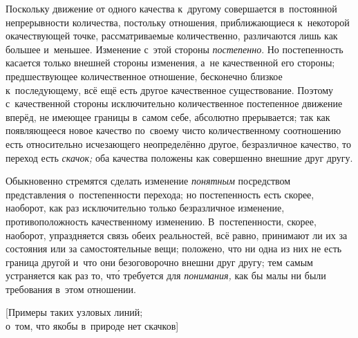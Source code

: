 Поскольку движение от одного качества к~другому совершается в~постоянной
непрерывности количества, постольку отношения, приближающиеся к~некоторой
окачествующей точке, рассматриваемые количественно, различаются лишь как
большее и~меньшее. Изменение с~этой стороны {\em постепенно}. Но постепенность
касается только внешней стороны изменения, а~не качественной его стороны;
предшествующее количественное отношение, бесконечно близкое к~последующему,
всё ещё есть другое качественное существование. Поэтому с~качественной стороны
исключительно количественное постепенное движение вперёд, не имеющее границы
в~самом себе, абсолютно прерывается; так как появляющееся новое качество
по~своему чисто количественному соотношению есть относительно исчезающего
неопределённо другое, безразличное качество, то переход есть {\em скачок;}
оба качества положены как совершенно внешние друг другу.

Обыкновенно стремятся сделать изменение {\em понятным} посредством
представления о~постепенности перехода; но постепенность есть скорее, наоборот,
как раз исключительно только безразличное изменение, противоположность
качественному изменению. В~постепенности, скорее, наоборот, упраздняется связь
обеих реальностей, всё равно, принимают ли их за состояния или за
самостоятельные вещи; положено, что ни одна из них не есть граница другой и~что
они безоговорочно внешни друг другу; тем самым устраняется как раз то, чт\'{о}
требуется для {\em понимания,} как бы малы ни были требования в~этом отношении.

%
{[Примеры таких узловых линий;\\о~том, что якобы в~природе нет скачков]}

